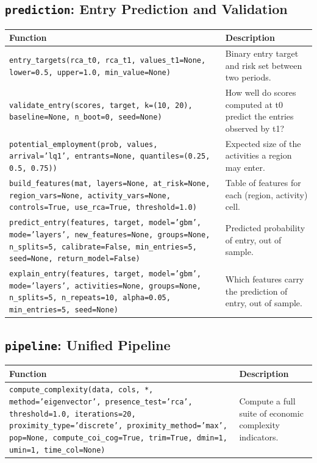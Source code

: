 \subsection{\texttt{prediction}: Entry Prediction and Validation}
\begin{longtable}{>{\raggedright\arraybackslash}p{9.2cm} >{\raggedright\arraybackslash}p{7.0cm}}
\toprule
\textbf{Function} & \textbf{Description} \\
\midrule\endhead
\texttt{\footnotesize entry\_targets(rca\_t0, rca\_t1, values\_t1=None, lower=0.5, upper=1.0, min\_value=None)} & {\small Binary entry target and risk set between two periods.} \\[2pt]
\texttt{\footnotesize validate\_entry(scores, target, k=(10, 20), baseline=None, n\_boot=0, seed=None)} & {\small How well do scores computed at t0 predict the entries observed by t1?} \\[2pt]
\texttt{\footnotesize potential\_employment(prob, values, arrival='lq1', entrants=None, quantiles=(0.25, 0.5, 0.75))} & {\small Expected size of the activities a region may enter.} \\[2pt]
\texttt{\footnotesize build\_features(mat, layers=None, at\_risk=None, region\_vars=None, activity\_vars=None, controls=True, use\_rca=True, threshold=1.0)} & {\small Table of features for each (region, activity) cell.} \\[2pt]
\texttt{\footnotesize predict\_entry(features, target, model='gbm', mode='layers', new\_features=None, groups=None, n\_splits=5, calibrate=False, min\_entries=5, seed=None, return\_model=False)} & {\small Predicted probability of entry, out of sample.} \\[2pt]
\texttt{\footnotesize explain\_entry(features, target, model='gbm', mode='layers', activities=None, groups=None, n\_splits=5, n\_repeats=10, alpha=0.05, min\_entries=5, seed=None)} & {\small Which features carry the prediction of entry, out of sample.} \\[2pt]
\bottomrule
\end{longtable}

\subsection{\texttt{pipeline}: Unified Pipeline}
\begin{longtable}{>{\raggedright\arraybackslash}p{9.2cm} >{\raggedright\arraybackslash}p{7.0cm}}
\toprule
\textbf{Function} & \textbf{Description} \\
\midrule\endhead
\texttt{\footnotesize compute\_complexity(data, cols, *, method='eigenvector', presence\_test='rca', threshold=1.0, iterations=20, proximity\_type='discrete', proximity\_method='max', pop=None, compute\_coi\_cog=True, trim=True, dmin=1, umin=1, time\_col=None)} & {\small Compute a full suite of economic complexity indicators.} \\[2pt]
\bottomrule
\end{longtable}
